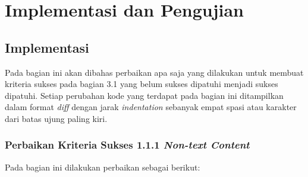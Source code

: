\chapter{Implementasi dan Pengujian}
\label{chap:implementasi_dan_pengujian}

\section{Implementasi}
\label{sec:implementasi}
Pada bagian ini akan dibahas perbaikan apa saja yang dilakukan untuk membuat kriteria sukses pada bagian 3.1
yang belum sukses dipatuhi menjadi sukses dipatuhi. Setiap perubahan kode yang terdapat pada bagian ini ditampilkan dalam format \textit{diff} dengan jarak \textit{indentation} sebanyak empat spasi atau karakter dari batas ujung paling kiri.

\subsection{Perbaikan Kriteria Sukses 1.1.1 \textit{Non-text Content}}
\label{subsec:perbaikan_kriteria_sukses_1.1.1}
Pada bagian ini dilakukan perbaikan sebagai berikut:

